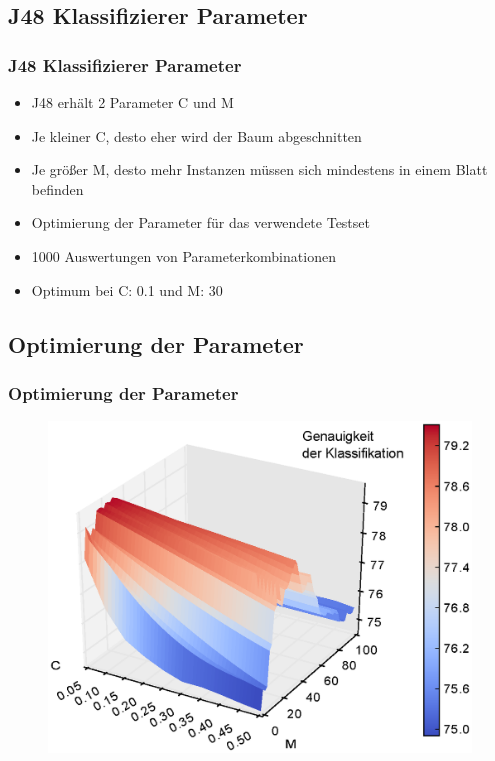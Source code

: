 \documentclass[accentcolor=tud6b,colorbacktitle,inverttitle,landscape,german,presentation,t]{tudbeamer}
\begin{document}
	\subsection{J48 Klassifizierer Parameter}
		\begin{frame}
		\frametitle{J48 Klassifizierer Parameter}
		\begin{itemize}
		\item J48 erhält 2 Parameter C und M
		\item Je kleiner C, desto eher wird der Baum abgeschnitten
		\item Je größer M, desto mehr Instanzen müssen sich mindestens in einem Blatt befinden
		\item Optimierung der Parameter für das verwendete Testset
		\item 1000 Auswertungen von Parameterkombinationen
		\item Optimum bei C: 0.1 und M: 30
		\end{itemize}
		\end{frame}

	\subsection{Optimierung der Parameter}
		\begin{frame}
		\frametitle{Optimierung der Parameter}
		\begin{figure}[Hh]
    		\includegraphics[width=\textwidth,height=\textheight,keepaspectratio]{./img/parameter.eps}
		\end{figure}
		\end{frame}
\end{document}
